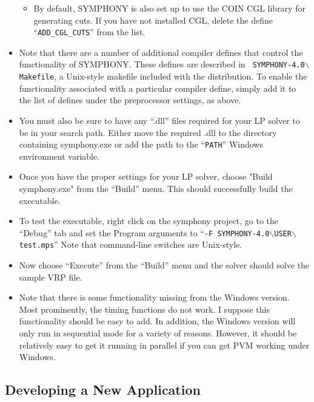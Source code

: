 \begin{itemize}
\begin{itemize}
\item By default, SYMPHONY is also set up to use the COIN CGL library for
generating cuts. If you have not installed CGL, delete the define
``\texttt{ADD\_CGL\_CUTS}'' from the list.


\end{itemize}

\item Note that there are a number of additional compiler defines that control
the functionality of SYMPHONY. These defines are described in {\tt
SYMPHONY-4.0$\backslash$Makefile}, a Unix-style makefile included with the
distribution. To enable the functionality associated with a particular
compiler define, simply add it to the list of defines under the preprocessor
settings, as above.

\item You must also be sure to have any ``.dll'' files required for your LP 
solver to be in your search path. Either move the required .dll to the
directory containing symphony.exe or add the path to the ``{\tt PATH}''
Windows environment variable.

\item Once you have the proper settings for your LP solver, choose "Build
symphony.exe" from the ``Build'' menu. This should successfully build the
executable.

\item To test the executable, right click on the symphony project, go to the
``Debug'' tab and set the Program arguments to ``{\tt -F
SYMPHONY-4.0$\backslash$USER$\backslash$test.mps}'' Note that command-line
switches are Unix-style. 

\item Now choose ``Execute'' from the ``Build'' menu and the solver should 
solve the sample VRP file.

\item Note that there is some functionality missing from the Windows
version. Most prominently, the timing functions do not work. I suppose this
functionality should be easy to add. In addition, the Windows
version will only run in sequential mode for a variety of reasons. However, it
should be relatively easy to get it running in parallel if you can get PVM
working under Windows.

\end{itemize}

\subsection{Developing a New Application}

